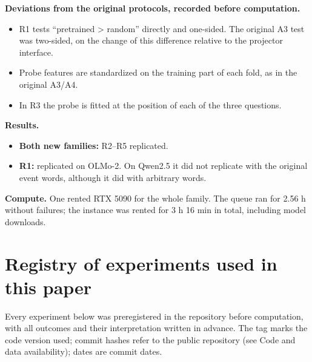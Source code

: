 \documentclass[11pt]{article}
\begin{document}
\textbf{Deviations from the original protocols, recorded before computation.}
\begin{itemize}
\item R1 tests ``pretrained > random'' directly and one-sided. The original A3 test was two-sided, on the change of this difference relative to the projector interface.
\item Probe features are standardized on the training part of each fold, as in the original A3/A4.
\item In R3 the probe is fitted at the position of each of the three questions.
\end{itemize}

\textbf{Results.}
\begin{itemize}
\item \textbf{Both new families:} R2--R5 replicated.
\item \textbf{R1:} replicated on OLMo-2. On Qwen2.5 it did not replicate with the original event words, although it did with arbitrary words.
\end{itemize}

\textbf{Compute.} One rented RTX 5090 for the whole family. The queue ran for 2.56 h without failures; the instance was rented for 3 h 16 min in total, including model downloads.

\section{Registry of experiments used in this paper}



Every experiment below was preregistered in the repository before computation, with all outcomes and their interpretation written in advance. The tag marks the code version used; commit hashes refer to the public repository (see Code and data availability); dates are commit dates.
\end{document}
